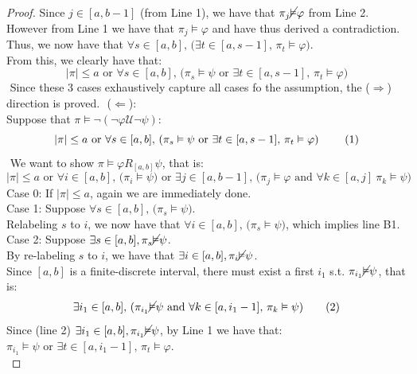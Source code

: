 \documentclass[runningheads]{llncs}
\renewcommand{\phi}{\varphi}
\begin{document}
\begin{proof}
\indent \indent Since $j \in [a,b-1]$ (from Line 1), we have that $\pi_j \cancel{\vDash} \phi$ from Line 2.\\
\indent \indent However from Line 1 we have that $\pi_j \vDash \phi$ and have thus derived a contradiction.\\
\indent \indent Thus, we now have that $ \forall s \in [a,b] \text{, (} \exists t \in [a, s-1] \text{, } \pi_t \vDash \phi \text{)}$.\\ \indent \indent From this, we clearly have that:
\[
|\pi| \le a \text{ or } \forall s \in [a,b] \text{, (} \pi_s \vDash \psi \text{ or } \exists t \in [a, s-1] \text{, } \pi_t \vDash \phi \text{)} \tag{A1}
\]
$ $ \newline
\indent Since these $3$ cases exhaustively capture all cases fo the assumption, the ($\Rightarrow$) direction is proved.
$ $ \newline
\noindent ($\Leftarrow$):\\
\indent Suppose that $\pi \vDash \neg (\neg \phi \mathcal{U} \neg \psi)$:
\[
|\pi| \le a \text{ or } \forall s \in [a,b] \text{, (} \pi_s \vDash \psi \text{ or } \exists t \in [a, s-1] \text{, } \pi_t \vDash \phi \text{) \tag{1}}
\]
$ $ \newline
\indent We want to show $\pi \vDash \phi R_{[a,b]} \psi$, that is:
\[ |\pi| \leq a \text{ or } \forall i \in [a,b] \text{, (} \pi_i \vDash \psi \text{) or } \exists j \in [a,b-1] \text{, (} \pi_j \vDash \phi \text{ and } \forall k \in [a, j] \ \pi_k \vDash \psi \text{)} \tag{B1} \]
\indent Case 0: If $|\pi| \leq a$, again we are immediately done. \\
\indent Case 1: Suppose $\forall s \in [a,b] \text{, (} \pi_s \vDash \psi \text{)}$.\\ 
\indent \indent Relabeling $s$ to $i$, we now have that $\forall i \in [a, b] \text{, (}\pi_s \vDash \psi \text{)}$, which implies line B1. \\
\indent Case 2: Suppose $\exists s \in [a,b], \pi_s \cancel{\vDash} \psi$.\\
\indent \indent By re-labeling $s$ to $i$, we have that $\exists i \in [a,b], \pi_i \cancel{\vDash} \psi$.\\
\indent \indent Since $[a,b]$ is a finite-discrete interval, there must exist a first $i_1$ s.t. $\pi_{i_1} \cancel{\vDash} \psi$, that is:
\[ 
\exists i_1 \in [a,b]\text{, (}  \pi_{i_1} \cancel{\vDash} \psi  \text{ and }  \forall k \in [a, i_1 - 1] \text{, } \pi_{k} \vDash \psi \text{)}
\tag{2}\]
\indent \indent Since (line 2) $\exists i_1 \in [a,b], \pi_{i_1} \cancel{\vDash} \psi$, by Line 1 we have that: $\pi_{i_1} \vDash \psi \text{ or } \exists t \in [a, i_1 - 1] \text{, } \pi_t \vDash \phi$.\\

\end{proof}
\end{document}
